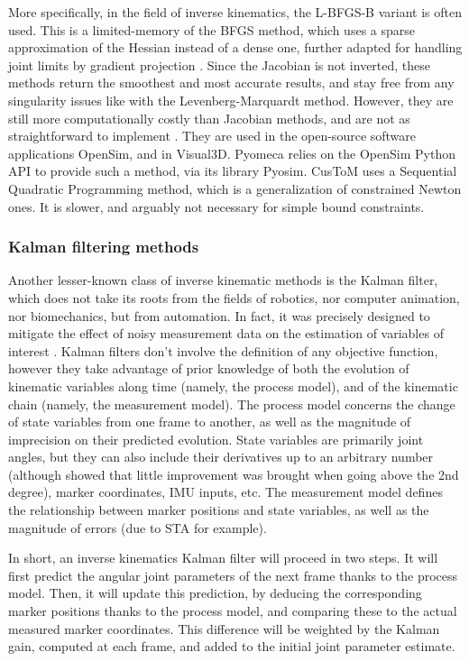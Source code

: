More specifically, in the field of inverse kinematics, the L-BFGS-B variant is often used. This is a limited-memory of the BFGS method, which uses a sparse approximation of the Hessian instead of a dense one, further adapted for handling joint limits by gradient projection \cite{Byrd1995,Zhao1994}. Since the Jacobian is not inverted, these methods return the smoothest and most accurate results, and stay free from any singularity issues like with the Levenberg-Marquardt method. However, they are still more computationally costly than Jacobian methods, and are not as straightforward to implement \cite{Aristidou2018}. They are used in the open-source software applications OpenSim, and in Visual3D. Pyomeca \cite{Martinez2020} relies on the OpenSim Python API to provide such a method, via its library Pyosim. CusToM uses a Sequential Quadratic Programming method, which is a generalization of constrained Newton ones. It is slower, and arguably not necessary for simple bound constraints.


\newpage
\subsubsection{Kalman filtering methods}

Another lesser-known class of inverse kinematic methods is the Kalman filter, which does not take its roots from the fields of robotics, nor computer animation, nor biomechanics, but from automation. In fact, it was precisely designed to mitigate the effect of noisy measurement data on the estimation of variables of interest \cite{Kalman1960}. Kalman filters don't involve the definition of any objective function, however they take advantage of prior knowledge of both the evolution of kinematic variables along time (namely, the process model), and of the kinematic chain (namely, the measurement model). The process model concerns the change of state variables from one frame to another, as well as the magnitude of imprecision on their predicted evolution. State variables are primarily joint angles, but they can also include their derivatives up to an arbitrary number (although \cite{DeGroote2008} showed that little improvement was brought when going above the 2nd degree), marker coordinates, IMU inputs, etc. The measurement model defines the relationship between marker positions and state variables, as well as the magnitude of errors (due to STA for example). 

In short, an inverse kinematics Kalman filter will proceed in two steps. It will first predict the angular joint parameters of the next frame thanks to the process model. Then, it will update this prediction, by deducing the corresponding marker positions thanks to the process model, and comparing these to the actual measured marker coordinates. This difference will be weighted by the Kalman gain, computed at each frame, and added to the initial joint parameter estimate. 


